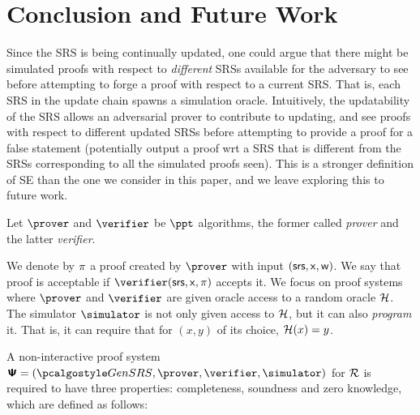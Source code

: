 \documentclass[10pt]{llncs}
\begin{document}
\section{Conclusion and Future Work}

Since the SRS is being continually updated, one could argue that there might be
simulated proofs with respect to \textit{different} SRSs available for the adversary
to see before attempting to forge a proof with respect to a current SRS.  That is,
each SRS in the update chain spawns a simulation oracle. Intuitively, the
updatability of the SRS allows an adversarial prover to contribute to updating, and
see proofs with respect to different updated SRSs before attempting to provide a
proof for a false statement (potentially output a proof wrt a SRS that is different
from the SRSs corresponding to all the simulated proofs seen).  This is a stronger
definition of SE than the one we consider in this paper, and we leave exploring this
to future work.




\appendix




%



%
%

\iffalse
Let $\prover$ and $\verifier$ be $\ppt$ algorithms, the former called \emph{prover}
and the latter \emph{verifier}. 

We denote by $\pi$ a proof created by $\prover$ with input
$(\mathsf{srs}, \mathsf{x}, \mathsf{w})$. We say that proof is acceptable if $\verifier (\srs, \inp,
\zkproof)$ accepts it. We focus on proof systems where $\prover$ and
$\verifier$ are given oracle access to a random oracle $\mathcal{H}$. The simulator
$\simulator$ is not only given access to $\mathcal{H}$, but it can also \emph{program}
it. That is, it can require that for $(x, y)$ of its choice, $\mathcal{H} (x) = y$.

A non-interactive  proof system $\proofsystem = (\kgen, \prover, \verifier, \simulator)$ for $\mathcal{R}$ is
required to have three properties: completeness, soundness and zero knowledge, which are
defined as follows:
\end{document}
